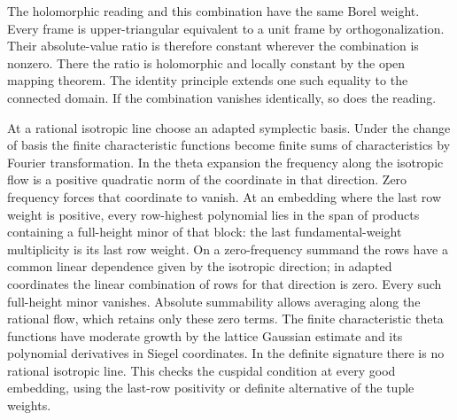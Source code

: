 The holomorphic reading and this combination have the same
Borel weight. Every frame is upper-triangular equivalent to
a unit frame by orthogonalization. Their absolute-value ratio
is therefore constant wherever the combination is nonzero.
There the ratio is holomorphic and locally constant by the
open mapping theorem. The identity principle extends one such
equality to the connected domain. If the combination vanishes
identically, so does the reading.

At a rational isotropic line choose an adapted symplectic
basis. Under the change of basis the finite characteristic
functions become finite sums of characteristics by Fourier
transformation. In the theta expansion the frequency along
the isotropic flow is a positive quadratic norm of the
coordinate in that direction. Zero frequency forces that
coordinate to vanish. At an embedding where the last row
weight is positive, every row-highest polynomial lies in the
span of products containing a full-height minor of that block:
the last fundamental-weight multiplicity is its last row
weight. On a zero-frequency summand the rows have a common
linear dependence given by the isotropic direction; in adapted
coordinates the linear combination of rows for that direction is
zero. Every such full-height minor vanishes. Absolute summability
allows averaging along the rational flow, which retains only
these zero terms. The finite characteristic theta functions
have moderate growth by the lattice Gaussian estimate and
its polynomial derivatives in Siegel coordinates. In the
definite signature there is no rational isotropic line. This
checks the cuspidal condition at every good embedding, using
the last-row positivity or definite alternative of the tuple
weights.

